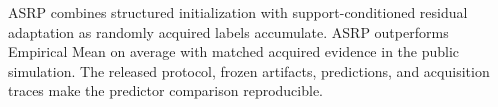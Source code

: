 ASRP combines structured initialization with support-conditioned residual adaptation as randomly acquired labels accumulate. ASRP outperforms Empirical Mean on average with matched acquired evidence in the public simulation. The released protocol, frozen artifacts, predictions, and acquisition traces make the predictor comparison reproducible.
